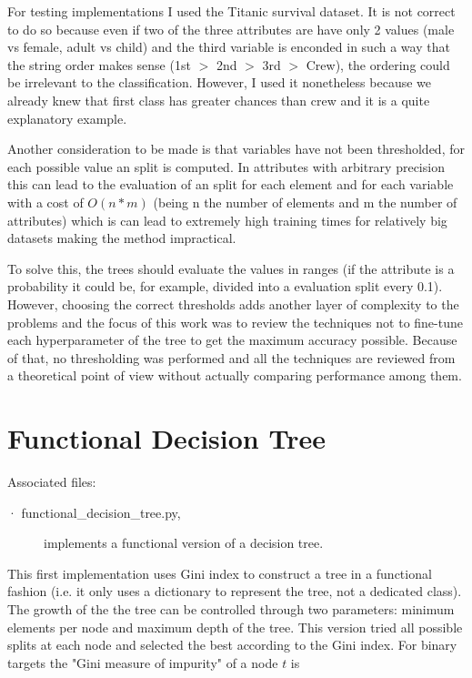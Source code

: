 \documentclass[a4paper,10pt]{article}
\begin{document}
For testing implementations I used the Titanic survival dataset. It is not correct to do so because even if two of the three attributes are have only 2 values (male vs female, adult vs child) and the third variable is enconded in such a way that the string order makes sense (1st $>$ 2nd $>$ 3rd $>$ Crew), the ordering could be irrelevant to the classification. However, I used it nonetheless because we already knew that first class has greater chances than crew and it is a quite explanatory example.

Another consideration to be made is that variables have not been thresholded, for each possible value an split is computed. In attributes with arbitrary precision this can lead to the evaluation of an split for each element and for each variable with a cost of $O(n*m)$ (being n the number of elements and m the number of attributes) which is can lead to extremely high training times for relatively big datasets making the method impractical. 

To solve this, the trees should evaluate the values in ranges (if the attribute is a probability it could be, for example, divided into a evaluation split every 0.1). However, choosing the correct thresholds adds another layer of complexity to the problems and the focus of this work was to review the techniques not to fine-tune each hyperparameter of the tree to get the maximum accuracy possible. Because of that, no thresholding was performed and all the techniques are reviewed from a theoretical point of view without actually comparing performance among them.

\section{Functional Decision Tree}

Associated files:
\begin{description}
 \item [· functional\_decision\_tree.py,] implements a functional version of a decision tree.
\end{description}

This first implementation uses Gini index to construct a tree in a functional fashion (i.e. it only uses a dictionary to represent the tree, not a dedicated class). The growth of the the tree can be controlled through two parameters: minimum elements per node and maximum depth of the tree. This version tried all possible splits at each node and selected the best according to the Gini index. For binary targets the "Gini measure of impurity" of a node $t$ is
\end{document}
